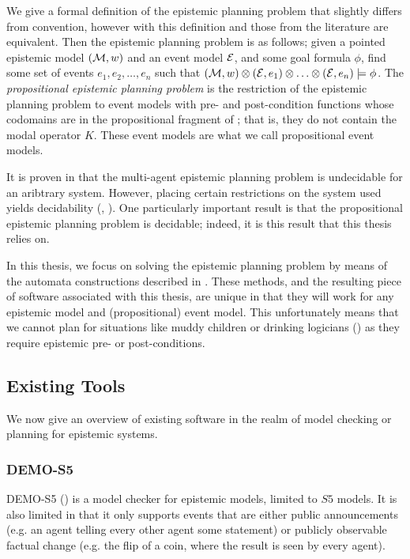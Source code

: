 \documentclass[12pt, a4paper]{article}
\begin{document}
We give a formal definition of the epistemic planning problem that slightly
differs from convention, however with this definition and those from the
literature are equivalent. Then the epistemic planning problem is as follows;
given a pointed epistemic model $(\mathcal{M}, w)$ and an event model $\mathcal{E}$, and
some goal formula $\phi$, find some set of events ${e_1, e_2, \ldots, e_n}$ such
that $(\mathcal{M}, w) \otimes (\mathcal{E}, e_1) \otimes \ldots \otimes (\mathcal{E}, e_n)
\models \phi$. The \textit{propositional epistemic planning problem} is the
restriction of the epistemic planning problem to event models with pre- and
post-condition functions whose codomains are in the propositional fragment of
; that is, they do not contain the modal operator $K$. These event models
are what we call propositional event models.

It is proven in \cite{BolanderEP} that the multi-agent epistemic planning
problem is undecidable for an aribtrary system. However, placing certain
restrictions on the system used yields decidability (\cite{DecidabilityEp},
\cite{AutomataTechniques}). One particularly important result is that the
propositional epistemic planning problem is decidable; indeed, it is this result
that this thesis relies on. 

\bigskip \bigskip \bigskip

In this thesis, we focus on solving the epistemic planning problem by means of
the automata constructions described in \cite{AutomataTechniques}. These
methods, and the resulting piece of software associated with this thesis, are
unique in that they will work for any epistemic model and (propositional) event
model. This unfortunately means that we cannot plan for situations like muddy
children or drinking logicians (\cite{DEMO-S5}) as they require epistemic pre-
or post-conditions. 


\subsection{Existing Tools}

We now give an overview of existing software in the realm of model checking or
planning for epistemic systems.

\subsubsection{DEMO-S5}

DEMO-S5 (\cite{DEMO-S5}) is a model checker for epistemic models, limited to
$S5$ models. It is also limited in that it only supports events that are either
public announcements (e.g. an agent telling every other agent some statement) or
publicly observable factual change (e.g. the flip of a coin, where the result is
seen by every agent).
\end{document}
